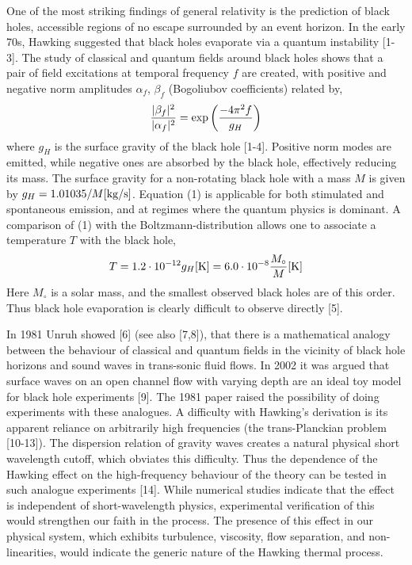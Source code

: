 \documentclass[12pt,aps%
]{revtex4}
\def\bea{\begin{eqnarray}}
\def\eea{\end{eqnarray}}
\begin{document}
One of the most striking findings of general relativity is the prediction of
black holes, accessible regions of no escape surrounded by an event horizon.
In the early 70s, Hawking suggested that black holes evaporate via a quantum
instability [1-3]. The study of classical and quantum fields around black
holes shows that a pair of field excitations at temporal frequency $f$ are
created, with positive and negative norm amplitudes $\alpha_f$, $\beta_f$  (Bogoliubov coefficients) related by, 
\bea
{\vert\beta_f\vert^2\over \vert\alpha_f|^2}=\exp\left({-4\pi^2f\over
g_H}\right)
\eea
where $g_H$ is the surface gravity of the black hole [1-4]. Positive norm modes are emitted, while
negative ones are absorbed by the black hole, effectively reducing its mass.
The surface gravity for a non-rotating black hole with a mass $M$ is given by
$g_H = 1.01035/M [{\rm kg/s}]$. Equation (1) is applicable for both stimulated and
spontaneous emission, and at regimes where the quantum physics is dominant. A
comparison of (1) with the Boltzmann-distribution allows one to associate a
temperature $T$ with the black hole, 
\bea
T=1.2\cdot 10^{-12} g_H[{\rm K}]=6.0\cdot 10^{-8} {M_\circ\over M}[{\rm K}]
\eea
Here $M_\circ$ is a solar mass, and the smallest observed black holes are of
this order. Thus black hole evaporation is clearly difficult to observe
directly [5].

In 1981 Unruh showed [6] (see also [7,8]), that there is a mathematical
analogy between the behaviour of classical and quantum fields in the vicinity
of black hole horizons and sound waves in trans-sonic fluid flows. In 2002 it
was argued that surface waves on an open channel flow with varying depth are
an ideal toy model for black hole experiments [9]. The 1981 paper raised the
possibility of doing experiments with these analogues. A difficulty with
Hawking's derivation is its apparent reliance on arbitrarily high frequencies
(the trans-Planckian problem [10-13]). The dispersion relation of gravity
waves creates a natural physical short wavelength cutoff, which obviates this
difficulty. Thus the dependence of the Hawking effect on the high-frequency
behaviour of the theory can be tested in such analogue experiments [14]. While
numerical studies indicate that the effect is independent of short-wavelength
physics, experimental verification of this would strengthen our faith in the
process. The presence of this effect in our physical system, which exhibits
turbulence, viscosity, flow separation, and non-linearities, would indicate
the generic nature of the Hawking thermal process.
\end{document}
